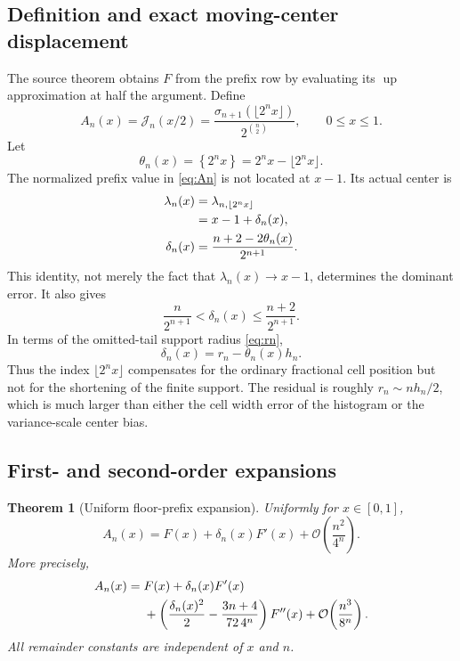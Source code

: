 \documentclass[11pt,oneside]{article}
\newtheorem{theorem}{Theorem}[section]
\theoremstyle{definition}
\theoremstyle{remark}
\newcommand{\Up}{\operatorname{up}}
\newcommand{\bigO}{\mathcal O}
\newcommand{\fract}[1]{\left\{#1\right\}}
\begin{document}
\subsection{Definition and exact moving-center displacement}

The source theorem obtains $F$ from the prefix row by evaluating its $\Up$ approximation at
half the argument.  Define
\begin{equation}
 A_n(x)=\mathcal J_n(x/2)
 =\frac{\sigma_{n+1}(\lfloor2^nx\rfloor)}{2^{\binom n2}},
 \qquad 0\le x\le1.                                      \label{eq:An}
\end{equation}
Let
\begin{equation}
 \theta_n(x)=\fract{2^nx}=2^nx-\lfloor2^nx\rfloor.        \label{eq:theta}
\end{equation}
The normalized prefix value in \eqref{eq:An} is not located at $x-1$.  Its actual center is
\begin{align}
 \lambda_n(x)
 &=\lambda_{n,\lfloor2^nx\rfloor} \notag\\
 &=x-1+\delta_n(x),                                        \label{eq:lambda-drift}\\
 \delta_n(x)
 &=\frac{n+2-2\theta_n(x)}{2^{n+1}}.                       \label{eq:delta}
\end{align}
This identity, not merely the fact that $\lambda_n(x)\to x-1$, determines the dominant error.
It also gives
\begin{equation}
 \frac{n}{2^{n+1}}<\delta_n(x)\le\frac{n+2}{2^{n+1}}.     \label{eq:delta-range}
\end{equation}
In terms of the omitted-tail support radius \eqref{eq:rn},
\begin{equation}
 \delta_n(x)=r_n-\theta_n(x)h_n.                           \label{eq:delta-rn}
\end{equation}
Thus the index $\lfloor2^nx\rfloor$ compensates for the ordinary fractional cell position but
not for the shortening of the finite support.  The residual is roughly $r_n\sim nh_n/2$,
which is much larger than either the cell width error of the histogram or the variance-scale
center bias.

\subsection{First- and second-order expansions}

\begin{theorem}[Uniform floor-prefix expansion]
\label{thm:floor-expansion}
Uniformly for $x\in[0,1]$,
\begin{equation}
 A_n(x)
 =F(x)+\delta_n(x)F'(x)
  +\bigO\!\left(\frac{n^2}{4^n}\right).                  \label{eq:floor-first}
\end{equation}
More precisely,
\begin{align}
 A_n(x)
={}&F(x)+\delta_n(x)F'(x) \notag\\
 &+\left(
    \frac{\delta_n(x)^2}{2}
    -\frac{3n+4}{72\,4^n}
   \right)F''(x)
 +\bigO\!\left(\frac{n^3}{8^n}\right).                  \label{eq:floor-second}
\end{align}
All remainder constants are independent of $x$ and $n$.
\end{theorem}
\end{document}
